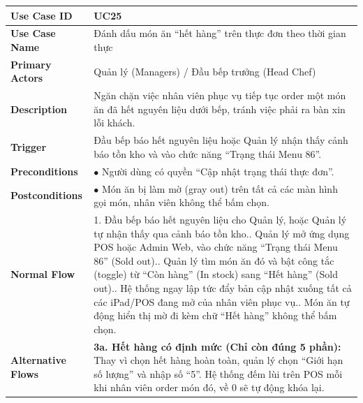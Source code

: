 \begin{longtable}{|p{3.5cm}|p{12.5cm}|}
\hline
\textbf{Use Case ID} & UC25 \\ \hline
\textbf{Use Case Name} & Đánh dấu món ăn ``hết hàng'' trên thực đơn theo thời gian thực \\ \hline
\textbf{Primary Actors} & Quản lý (Managers) / Đầu bếp trưởng (Head Chef) \\ \hline
\textbf{Description} & Ngăn chặn việc nhân viên phục vụ tiếp tục order một món ăn đã hết nguyên liệu dưới bếp, tránh việc phải ra bàn xin lỗi khách. \\ \hline
\textbf{Trigger} & Đầu bếp báo hết nguyên liệu hoặc Quản lý nhận thấy cảnh báo tồn kho và vào chức năng ``Trạng thái Menu 86''. \\ \hline
\textbf{Preconditions} & $\bullet$ Người dùng có quyền ``Cập nhật trạng thái thực đơn''. \\ \hline
\textbf{Postconditions} & $\bullet$ Món ăn bị làm mờ (gray out) trên tất cả các màn hình gọi món, nhân viên không thể bấm chọn. \\ \hline
\textbf{Normal Flow} &
1. Đầu bếp báo hết nguyên liệu cho Quản lý, hoặc Quản lý tự nhận thấy qua cảnh báo tồn kho.\newline
2. Quản lý mở ứng dụng POS hoặc Admin Web, vào chức năng ``Trạng thái Menu 86'' (Sold out).\newline
3. Quản lý tìm món ăn đó và bật công tắc (toggle) từ ``Còn hàng'' (In stock) sang ``Hết hàng'' (Sold out).\newline
4. Hệ thống ngay lập tức đẩy bản cập nhật xuống tất cả các iPad/POS đang mở của nhân viên phục vụ.\newline
5. Món ăn tự động hiển thị mờ đi kèm chữ ``Hết hàng'' không thể bấm chọn. \\ \hline
\textbf{Alternative Flows} &
\textbf{3a. Hết hàng có định mức (Chỉ còn đúng 5 phần):} Thay vì chọn hết hàng hoàn toàn, quản lý chọn ``Giới hạn số lượng'' và nhập số ``5''. Hệ thống đếm lùi trên POS mỗi khi nhân viên order món đó, về 0 sẽ tự động khóa lại. \\ \hline
\end{longtable}


